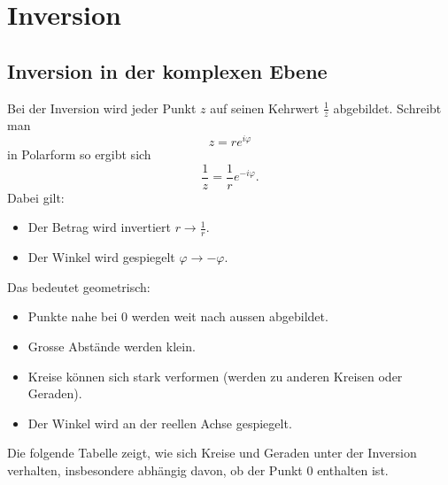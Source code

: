 %
%
%
%
\section{Inversion 
\label{moebius:section:teil2}}
\subsection{Inversion in der komplexen Ebene}

Bei der Inversion wird jeder Punkt \( z \) auf seinen Kehrwert \( \frac{1}{z} \) abgebildet.
Schreibt man
\[
z = r e^{i\varphi}
\]
in Polarform so ergibt sich
%
\[
\frac{1}{z} = \frac{1}{r} e^{-i\varphi}.
\]
Dabei gilt:
\begin{itemize}
	\item Der Betrag wird invertiert \( r \rightarrow \frac{1}{r} \).  
	\item Der Winkel wird gespiegelt \( \varphi \rightarrow -\varphi \).
\end{itemize}
Das bedeutet geometrisch:
\begin{itemize}
	\item Punkte nahe bei \(0\) werden weit nach aussen abgebildet. 
	\item Grosse Abstände werden klein.
	\item Kreise können sich stark verformen (werden zu anderen Kreisen oder Geraden).
	\item Der Winkel wird an der reellen Achse gespiegelt.
\end{itemize}
Die folgende Tabelle zeigt, wie sich Kreise und Geraden unter der Inversion verhalten, insbesondere abhängig davon, ob der Punkt \(0\) enthalten ist.



